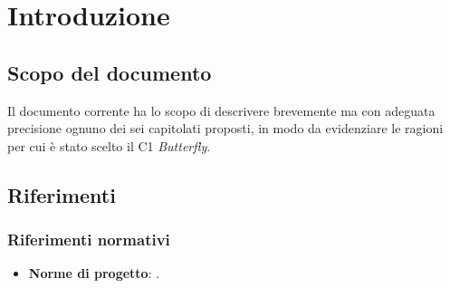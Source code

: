 \section{Introduzione} \label{introduzione}

    \subsection{Scopo del documento}
    Il documento corrente ha lo scopo di descrivere brevemente ma con adeguata precisione ognuno dei sei capitolati proposti,
    in modo da evidenziare le ragioni per cui è stato scelto il  C1 \textit{Butterfly}.

    

    

    \subsection{Riferimenti}

        \subsubsection{Riferimenti normativi}
            \begin{itemize}
                \item \textbf{Norme di progetto}: .
            \end{itemize}

